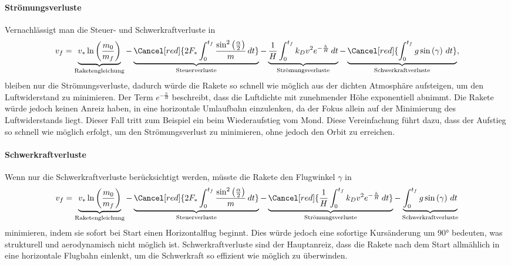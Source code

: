 \paragraph{Strömungsverluste} Vernachlässigt man die Steuer- und Schwerkraftverluste in  
\begin{equation*}
	v_f = \underbrace{v_* \ln \left(\frac{m_0}{m_f}\right)}_{\text{Raketengleichung}} 
	- \underbrace{\Cancel[red]{2F_* \int_0^{t_f} \frac{\sin^2\left(\frac{\alpha}{2}\right)}{m} \, dt }}_{\text{Steuerverluste}}
	- \underbrace{\frac{1}{H} \int_0^{t_f} k_Dv^2 e^{-\frac{h}{H}} \, dt }_{\text{Strömungsverluste}}
	- \underbrace{\Cancel[red]{\int_0^{t_f} g \sin \left(\gamma\right) \, dt}}_{\text{Schwerkraftverluste}},
\end{equation*}
bleiben nur die Strömungsverluste, dadurch würde die Rakete so schnell wie möglich aus der dichten Atmosphäre aufsteigen, um den Luftwiderstand zu minimieren. 
Der Term $e^{-\frac{h}{H}}$ beschreibt, dass die Luftdichte mit zunehmender Höhe exponentiell abnimmt. 
Die Rakete würde jedoch keinen Anreiz haben, in eine horizontale Umlaufbahn einzulenken, da der Fokus allein auf der Minimierung des Luftwiderstands liegt.
Dieser Fall tritt zum Beispiel ein beim Wiederaufstieg vom Mond.
Diese Vereinfachung führt dazu, dass der Aufstieg so schnell wie möglich erfolgt, um den Strömungsverlust zu minimieren, ohne jedoch den Orbit zu erreichen.

\paragraph{Schwerkraftverluste} Wenn nur die Schwerkraftverluste berücksichtigt werden, müsste die Rakete den Flugwinkel \(\gamma\) in
\begin{equation*}
	v_f = \underbrace{v_* \ln \left(\frac{m_0}{m_f}\right)}_{\text{Raketengleichung}} 
	- \underbrace{\Cancel[red]{2F_* \int_0^{t_f} \frac{\sin^2\left(\frac{\alpha}{2}\right)}{m} \, dt }}_{\text{Steuerverluste}}
	- \underbrace{\Cancel[red]{\frac{1}{H} \int_0^{t_f} k_Dv^2 e^{-\frac{h}{H}} \, dt }}_{\text{Strömungsverluste}}
	- \underbrace{\int_0^{t_f} g \sin \left(\gamma\right) \, dt}_{\text{Schwerkraftverluste}}
\end{equation*}
minimieren, indem sie sofort bei Start einen Horizontalflug beginnt. 
Dies würde jedoch eine sofortige Kursänderung um 90° bedeuten, was strukturell und aerodynamisch nicht möglich ist. 
Schwerkraftverluste sind der Hauptanreiz, dass die Rakete nach dem Start allmählich in eine horizontale Flugbahn einlenkt, um die Schwerkraft so effizient wie möglich zu überwinden.

